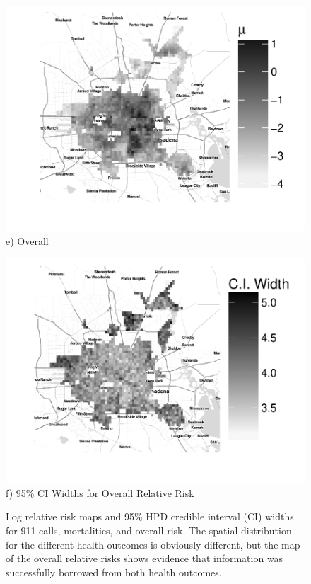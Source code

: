 \documentclass[final]{statsoc}
\begin{document}
\begin{figure}
\begin{minipage}[t]{0.49\textwidth}
    \centering
    \includegraphics[width=1.0\textwidth]{./imgs/relative_risk_mu.pdf}
    \\
    e) Overall
    \\
  \end{minipage}
  \hfill
  \begin{minipage}[t]{0.49\textwidth}
    \centering
    \includegraphics[width=1.0\textwidth]{imgs/ci_width_mu.pdf}
    \\
    f) 95\% CI Widths for Overall Relative Risk
    \\
  \end{minipage}
  \caption{Log relative risk maps and 95\% HPD credible interval (CI) widths for 911 calls, mortalities, and overall risk. The spatial distribution for the different health outcomes is obviously different, but the map of the overall relative risks shows evidence that information was successfully borrowed from both health outcomes.}
  \label{relative_risks}
\end{figure}
\end{document}
